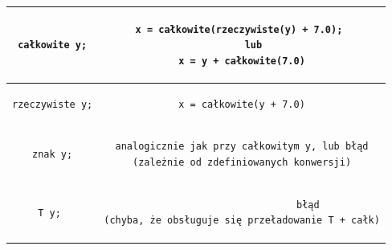 \begin{center}
  \label{tab:title} 
\begin{tabular}{|c|c|}
\hline
\begin{lstlisting}
całkowite y;
\end{lstlisting}
&
\begin{lstlisting}
x = całkowite(rzeczywiste(y) + 7.0); 
    lub
x = y + całkowite(7.0)
\end{lstlisting}
 \\ \hline

\begin{lstlisting}
rzeczywiste y;
\end{lstlisting}
&
\begin{lstlisting}
x = całkowite(y + 7.0)
\end{lstlisting}
 \\ \hline

\begin{lstlisting}
znak y;
\end{lstlisting}
&
\begin{lstlisting}
analogicznie jak przy całkowitym y, lub błąd
(zależnie od zdefiniowanych konwersji)
\end{lstlisting}
 \\ \hline

\begin{lstlisting}
T y; 
\end{lstlisting}
&
\lstset{
    escapechar=|,
    breaklines=true
}
\begin{lstlisting}
                        błąd 
(chyba, że obsługuje się przeładowanie T + całk)
\end{lstlisting}
 \\ \hline

 
\end{tabular}
\end{center}

                
